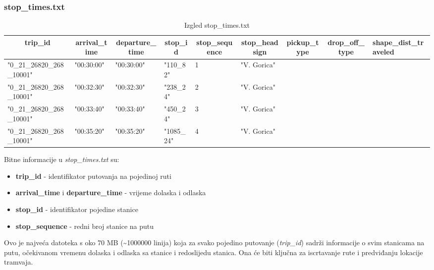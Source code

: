 \documentclass[zavrsnirad]{fer}
\begin{document}
\subsubsection{stop\_times.txt}

\begin{table}[htb]
	\begin{adjustbox}{width=\columnwidth,center}
		\begin{tabular}{l|l|l|l|l|l|l|l|l}
			\hline
			\multicolumn{1}{c|}{\textbf{trip\_id}} & \multicolumn{1}{c|}{\textbf{arrival\_time}} & \multicolumn{1}{c|}{\textbf{departure\_time}} & \multicolumn{1}{c|}{\textbf{stop\_id}} & \multicolumn{1}{c|}{\textbf{stop\_sequence}} & \multicolumn{1}{c|}{\textbf{stop\_headsign}} & \multicolumn{1}{c|}{\textbf{pickup\_type}} & \multicolumn{1}{c|}{\textbf{drop\_off\_type}} & \textbf{shape\_dist\_traveled} \\ \hline
			"0\_21\_26820\_268\_10001" & "00:30:00" & "00:30:00" & "110\_82" & 1 & "V. Gorica" &  &  &  \\ \hline
			"0\_21\_26820\_268\_10001" & "00:32:30" & "00:32:30" & "238\_24" & 2 & "V. Gorica" &  &  &  \\ \hline
			"0\_21\_26820\_268\_10001" & "00:33:40" & "00:33:40" & "450\_24" & 3 & "V. Gorica" &  &  &  \\ \hline
			"0\_21\_26820\_268\_10001" & "00:35:20" & "00:35:20" & "1085\_24" & 4 & "V. Gorica" &  &  &  \\ \hline
		\end{tabular}
	\end{adjustbox}
	\caption{Izgled stop\_times.txt}
	\label{tbl:stop_times}
\end{table}

Bitne informacije u \textit{stop\_times.txt} su:
\begin{itemize}
	\item \textbf{trip\_id} - identifikator putovanja na pojedinoj ruti
	\item \textbf{arrival\_time} i \textbf{departure\_time} - vrijeme dolaska i odlaska
	\item \textbf{stop\_id} - identifikator pojedine stanice
	\item \textbf{stop\_sequence} - redni broj stanice na putu
\end{itemize}
Ovo je najveća datoteka s oko 70 MB (\textasciitilde{}1000000 linija) koja za svako pojedino putovanje (\textit{trip\_id}) sadrži informacije o svim stanicama na putu, očekivanom vremenu dolaska i odlaska sa stanice i redoslijedu stanica. Ona će biti ključna za iscrtavanje rute i predviđanju lokacije tramvaja.
\newpage
\end{document}
